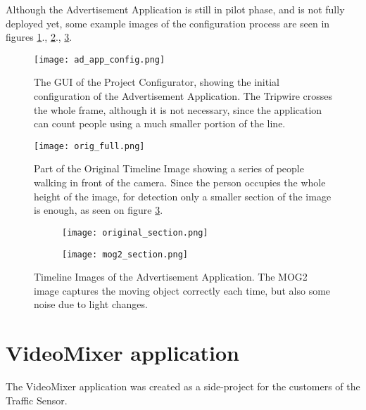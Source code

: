 Although the Advertisement Application is still in pilot phase, and is not fully deployed yet, some example images of the configuration process are seen in figures \ref{fig:adv_app_config}., \ref{fig:adv_app_full_orig}., \ref{fig:adv_app_counting}.

\begin{figure}[!h]
	\centering
	\texttt{[image: ad\_app\_config.png]}
	
	\caption{The GUI of the Project Configurator, showing the initial configuration of the Advertisement Application. The Tripwire crosses the whole frame, although it is not necessary, since the application can count people using a much smaller portion of the line.  \label{fig:adv_app_config}}
\end{figure}

\begin{figure}[!h]
	\centering
	\texttt{[image: orig\_full.png]}
	
	\caption{Part of the Original Timeline Image showing a series of people walking in front of the camera. Since the person occupies the whole height of the image, for detection only a smaller section of the image is enough, as seen on figure \ref{fig:adv_app_counting}.\label{fig:adv_app_full_orig}}
\end{figure}

\begin{figure}[!h]
	\centering
	\begin{subfigure}[t]{0.6\textwidth}
	\texttt{[image: original\_section.png]}
	\end{subfigure}
	\hfill
	\begin{subfigure}[t]{0.6\textwidth}
		\texttt{[image: mog2\_section.png]}
	\end{subfigure}

	\caption{Timeline Images of the Advertisement Application. The MOG2 image captures the moving object correctly each time, but also some noise due to light changes.\label{fig:adv_app_counting}}
\end{figure}

\clearpage\section{VideoMixer application}
The VideoMixer application was created as a side-project for the customers of the Traffic Sensor.

